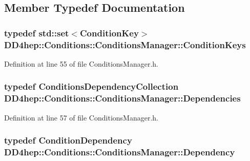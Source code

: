 \subsection{Member Typedef Documentation}
\hypertarget{class_d_d4hep_1_1_conditions_1_1_conditions_manager_a8dd76f9acef2c8d3b7970e266fe7eff6}{
\subsubsection[{ConditionKeys}]{\setlength{\rightskip}{0pt plus 5cm}typedef std::set$<${\bf ConditionKey}$>$ {\bf DD4hep::Conditions::ConditionsManager::ConditionKeys}}}
\label{class_d_d4hep_1_1_conditions_1_1_conditions_manager_a8dd76f9acef2c8d3b7970e266fe7eff6}


Definition at line 55 of file ConditionsManager.h.\hypertarget{class_d_d4hep_1_1_conditions_1_1_conditions_manager_aab778cfbe096ae8ad20a0bdbb047ad32}{
\subsubsection[{Dependencies}]{\setlength{\rightskip}{0pt plus 5cm}typedef {\bf ConditionsDependencyCollection} {\bf DD4hep::Conditions::ConditionsManager::Dependencies}}}
\label{class_d_d4hep_1_1_conditions_1_1_conditions_manager_aab778cfbe096ae8ad20a0bdbb047ad32}


Definition at line 57 of file ConditionsManager.h.\hypertarget{class_d_d4hep_1_1_conditions_1_1_conditions_manager_a8787c205ff23a5883d7bf98f9b06b408}{
\subsubsection[{Dependency}]{\setlength{\rightskip}{0pt plus 5cm}typedef {\bf ConditionDependency} {\bf DD4hep::Conditions::ConditionsManager::Dependency}}}
\label{class_d_d4hep_1_1_conditions_1_1_conditions_manager_a8787c205ff23a5883d7bf98f9b06b408}


